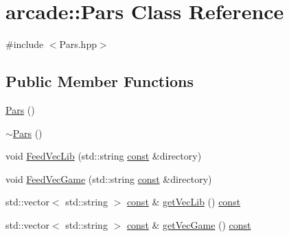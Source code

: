 \hypertarget{classarcade_1_1_pars}{\section{arcade\-:\-:Pars Class Reference}
\label{classarcade_1_1_pars}
}


{\ttfamily \#include $<$Pars.\-hpp$>$}

\subsection*{Public Member Functions}
\begin{DoxyCompactItemize}
\item 
\hyperlink{classarcade_1_1_pars_ab061fc89af8485ff0df54d053445decd}{Pars} ()
\item 
\hyperlink{classarcade_1_1_pars_ac3b430ed0b56ecc765179263ccf71f98}{$\sim$\-Pars} ()
\item 
void \hyperlink{classarcade_1_1_pars_a56282e94b6450b9231c40a9536372cc7}{Feed\-Vec\-Lib} (std\-::string \hyperlink{term__entry_8h_a57bd63ce7f9a353488880e3de6692d5a}{const} \&directory)
\item 
void \hyperlink{classarcade_1_1_pars_ab45f4970e308ad6ed78e0be75467c3a1}{Feed\-Vec\-Game} (std\-::string \hyperlink{term__entry_8h_a57bd63ce7f9a353488880e3de6692d5a}{const} \&directory)
\item 
std\-::vector$<$ std\-::string $>$ \hyperlink{term__entry_8h_a57bd63ce7f9a353488880e3de6692d5a}{const} \& \hyperlink{classarcade_1_1_pars_ad8374f7e92c2c2d79a799112c03bde5a}{get\-Vec\-Lib} () \hyperlink{term__entry_8h_a57bd63ce7f9a353488880e3de6692d5a}{const} 
\item 
std\-::vector$<$ std\-::string $>$ \hyperlink{term__entry_8h_a57bd63ce7f9a353488880e3de6692d5a}{const} \& \hyperlink{classarcade_1_1_pars_ace36326e2a9287c182bfddc7e8674498}{get\-Vec\-Game} () \hyperlink{term__entry_8h_a57bd63ce7f9a353488880e3de6692d5a}{const} 
\end{DoxyCompactItemize}



